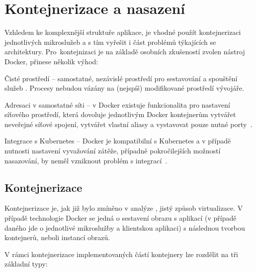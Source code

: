 \chapter{Kontejnerizace a nasazení}\label{ch:deployment}


Vzhledem ke komplexnější struktuře aplikace, je vhodné použít kontejnerizaci jednotlivých mikroslužeb a s tím vyřešit i část problémů týkajících se architektury.
Pro~kontejnizaci je na základě osobních zkušeností zvolen nástroj Docker, přinese několik výhod:

\begin{dl}
   \item[Čisté prostředí] – samostatné, nezávislé prostředí pro sestavování a spouštění služeb .
   Procesy nebudou vázány na (nejspíš) modifikované prostředí vývojáře.
   \item[Adresaci v samostatné síti] – v Docker existuje funkcionalita pro nastavení síťového prostředí, která dovoluje jednotlivým Docker kontejnerům vytvářet neveřejné síťové spojení, vytvářet vlastní aliasy a vystavovat pouze nutné porty~\cite{dockernetwork}.
   \item[Integrace s Kubernetes] – Docker je kompatibilní s Kubernetes a v případě nutnosti nastavení vyvažování zátěže, případně pokročilejších možností nasazování, by neměl vzniknout problém s integrací~\cite{dockerkubernetes}.
\end{dl}


\newpage



\section{Kontejnerizace}\label{sec:contenerization}

Kontejnerizace je, jak již bylo zmíněno v analýze , jistý způsob virtualizace.
V případě technologie Docker se jedná o sestavení obrazu s aplikací (v případě daného  jde o jednotlivé mikroslužby a klientskou aplikaci) s následnou tvorbou kontejnerů, neboli instancí obrazů.

V rámci kontejnerizace implementovaných částí kontejnery lze rozdělit na tři základní typy:

